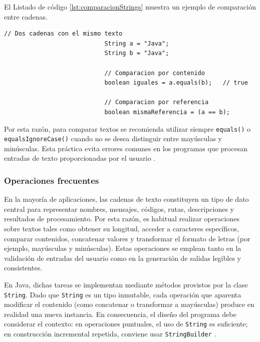 \documentclass[12pt,twoside]{book}
\begin{document}
						El Listado de código \ref{lst:comparacionStrings} muestra un ejemplo de comparación entre cadenas.
						
						\begin{lstlisting}[style=Java,caption={Comparación correcta de cadenas.},label={lst:comparacionStrings}]
							// Dos cadenas con el mismo texto
							String a = "Java";
							String b = "Java";
							
							// Comparacion por contenido
							boolean iguales = a.equals(b);   // true
							
							// Comparacion por referencia
							boolean mismaReferencia = (a == b);
						\end{lstlisting}
						
						\noindent
						Por esta razón, para comparar textos se recomienda utilizar siempre \texttt{equals()} o \texttt{equalsIgnoreCase()} cuando no se desea distinguir entre mayúsculas y minúsculas. Esta práctica evita errores comunes en los programas que procesan entradas de texto proporcionadas por el usuario \cite{Bloch2018EffectiveJava,Qian2018Students}.
						
					\subsubsection{Operaciones frecuentes}
						\noindent
						En la mayoría de aplicaciones, las cadenas de texto constituyen un tipo de dato central para representar nombres, mensajes, códigos, rutas, descripciones y resultados de procesamiento. Por esta razón, es habitual realizar operaciones sobre textos tales como obtener su longitud, acceder a caracteres específicos, comparar contenidos, concatenar valores y transformar el formato de letras (por ejemplo, mayúsculas y minúsculas). Estas operaciones se emplean tanto en la validación de entradas del usuario como en la generación de salidas legibles y consistentes.
						
						En Java, dichas tareas se implementan mediante métodos provistos por la clase \texttt{String}. Dado que \texttt{String} es un tipo inmutable, cada operación que aparenta modificar el contenido (como concatenar o transformar a mayúsculas) produce en realidad una nueva instancia. En consecuencia, el diseño del programa debe considerar el contexto: en operaciones puntuales, el uso de \texttt{String} es suficiente; en construcción incremental repetida, conviene usar \texttt{StringBuilder} \cite{Bloch2018EffectiveJava}.
						
\end{document}
